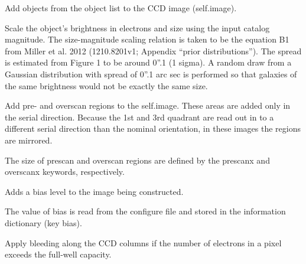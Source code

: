 \documentclass[a4paper,11pt,english]{sphinxmanual}
\begin{document}
\begin{fulllineitems}

\begin{fulllineitems}
\label{simulator:simulator.simulator.VISsimulator.addObjects}
Add objects from the object list to the CCD image (self.image).

Scale the object's brightness in electrons and size using the input catalog magnitude.
The size-magnitude scaling relation is taken to be the equation B1 from Miller et al. 2012 (1210.8201v1;
Appendix ``prior distributions''). The spread is estimated from Figure 1 to be around 0''.1 (1 sigma).
A random draw from a Gaussian distribution with spread of 0''.1 arc sec is performed so that galaxies
of the same brightness would not be exactly the same size.

\end{fulllineitems}


\begin{fulllineitems}
\label{simulator:simulator.simulator.VISsimulator.addPreOverScans}
Add pre- and overscan regions to the self.image. These areas are added only in the serial direction.
Because the 1st and 3rd quadrant are read out in to a different serial direction than the nominal
orientation, in these images the regions are mirrored.

The size of prescan and overscan regions are defined by the prescanx and overscanx keywords, respectively.

\end{fulllineitems}


\begin{fulllineitems}
\label{simulator:simulator.simulator.VISsimulator.applyBias}
Adds a bias level to the image being constructed.

The value of bias is read from the configure file and stored
in the information dictionary (key bias).

\end{fulllineitems}


\begin{fulllineitems}
\label{simulator:simulator.simulator.VISsimulator.applyBleeding}
Apply bleeding along the CCD columns if the number of electrons in a pixel exceeds the full-well capacity.


\end{fulllineitems}
\end{fulllineitems}
\end{document}
